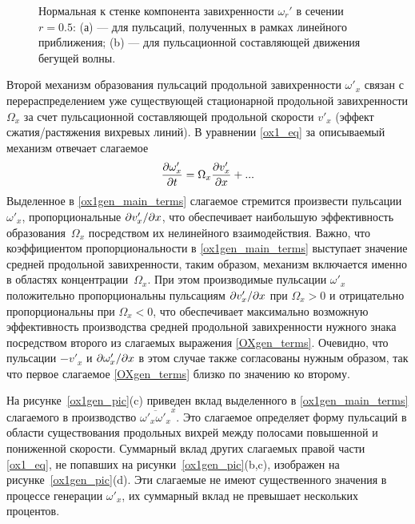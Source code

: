 \begin{figure}
\caption{Нормальная к стенке компонента завихренности $\omega_r'$ в сечении $r = 0.5$: (а) --- для пульсаций, полученных в рамках линейного приближения; (b) --- для пульсационной составляющей движения бегущей волны. }
\label{pipetw_or1_pic}
\end{figure}

Второй механизм образования пульсаций продольной завихренности $\omega'_x$ связан с перераспределением уже существующей стационарной продольной завихренности $\Omega_x$ за счет пульсационной составляющей продольной скорости $v'_x$ (эффект сжатия/растяжения вихревых линий). В уравнении \eqref{ox1_eq} за описываемый механизм отвечает слагаемое
\begin{equation}\label{ox1gen_main_terms}
\frac{\partial \omega'_x}{\partial t} = \Omega_x \frac {\partial v'_x}{\partial x} + ...
\end{equation}
Выделенное в \eqref{ox1gen_main_terms} слагаемое стремится произвести пульсации $\omega'_x$, пропорциональные $\partial v'_x / \partial x$, что обеспечивает наибольшую эффективность образования~$\Omega_x$ посредством их нелинейного взаимодействия. Важно, что коэффициентом пропорциональности в \eqref{ox1gen_main_terms} выступает значение средней продольной завихренности, таким образом, механизм включается именно в областях концентрации~$\Omega_x$. При этом производимые пульсации $\omega'_x$ положительно пропорциональны пульсациям  $\partial v'_x / \partial x$ при $\Omega_x>0$ и отрицательно пропорциональны при $\Omega_x<0$, что обеспечивает максимально возможную эффективность производства средней продольной завихренности нужного знака посредством второго из слагаемых выражения \eqref{OXgen_terms}. Очевидно, что пульсации $-v'_x$ и $\partial \omega'_x / \partial x$ в этом случае также согласованы нужным образом, так что первое слагаемое \eqref{OXgen_terms} близко по значению ко второму.

На рисунке~\ref{ox1gen_pic}(c) приведен вклад выделенного в \eqref{ox1gen_main_terms} слагаемого в производство $\overline{\omega'_x \omega'_x}^x$. Это слагаемое определяет форму пульсаций в области существования продольных вихрей между полосами повышенной и пониженной скорости. Суммарный вклад других слагаемых правой части \eqref{ox1_eq}, не попавших на рисунки~\ref{ox1gen_pic}(b,c), изображен на рисунке~\ref{ox1gen_pic}(d). Эти слагаемые не имеют существенного значения в процессе генерации $\omega'_x$, их суммарный вклад не превышает нескольких процентов. 

